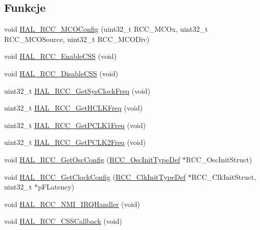 \subsection*{Funkcje}
\begin{DoxyCompactItemize}
\item 
void \hyperlink{group___r_c_c___exported___functions___group2_ga9de46b9c4ecdb1a5e34136b051a6132c}{H\+A\+L\+\_\+\+R\+C\+C\+\_\+\+M\+C\+O\+Config} (uint32\+\_\+t R\+C\+C\+\_\+\+M\+C\+Ox, uint32\+\_\+t R\+C\+C\+\_\+\+M\+C\+O\+Source, uint32\+\_\+t R\+C\+C\+\_\+\+M\+C\+O\+Div)
\item 
void \hyperlink{group___r_c_c___exported___functions___group2_gaa0f440ce71c18e95b12b2044cc044bea}{H\+A\+L\+\_\+\+R\+C\+C\+\_\+\+Enable\+C\+SS} (void)
\item 
void \hyperlink{group___r_c_c___exported___functions___group2_gac2f9cf8f56fd7b22c62ddf32aa5ee3fb}{H\+A\+L\+\_\+\+R\+C\+C\+\_\+\+Disable\+C\+SS} (void)
\item 
uint32\+\_\+t \hyperlink{group___r_c_c___exported___functions___group2_ga887cafe88b21a059061b077a1e3fa7d8}{H\+A\+L\+\_\+\+R\+C\+C\+\_\+\+Get\+Sys\+Clock\+Freq} (void)
\item 
uint32\+\_\+t \hyperlink{group___r_c_c___exported___functions___group2_ga38d6c5c7a5d8758849912c9aa0a2156d}{H\+A\+L\+\_\+\+R\+C\+C\+\_\+\+Get\+H\+C\+L\+K\+Freq} (void)
\item 
uint32\+\_\+t \hyperlink{group___r_c_c___exported___functions___group2_gab3042d8ac5703ac696cabf0ee461c599}{H\+A\+L\+\_\+\+R\+C\+C\+\_\+\+Get\+P\+C\+L\+K1\+Freq} (void)
\item 
uint32\+\_\+t \hyperlink{group___r_c_c___exported___functions___group2_gabbd5f8933a5ee05e4b3384e33026aca1}{H\+A\+L\+\_\+\+R\+C\+C\+\_\+\+Get\+P\+C\+L\+K2\+Freq} (void)
\item 
void \hyperlink{group___r_c_c___exported___functions___group2_gae2f9413fc447c2d7d6af3a8669c77b36}{H\+A\+L\+\_\+\+R\+C\+C\+\_\+\+Get\+Osc\+Config} (\hyperlink{struct_r_c_c___osc_init_type_def}{R\+C\+C\+\_\+\+Osc\+Init\+Type\+Def} $\ast$R\+C\+C\+\_\+\+Osc\+Init\+Struct)
\item 
void \hyperlink{group___r_c_c___exported___functions___group2_gabc95375dfca279d88b9ded9d063d2323}{H\+A\+L\+\_\+\+R\+C\+C\+\_\+\+Get\+Clock\+Config} (\hyperlink{struct_r_c_c___clk_init_type_def}{R\+C\+C\+\_\+\+Clk\+Init\+Type\+Def} $\ast$R\+C\+C\+\_\+\+Clk\+Init\+Struct, uint32\+\_\+t $\ast$p\+F\+Latency)
\item 
void \hyperlink{group___r_c_c___exported___functions___group2_ga0c124cf403362750513cae7fb6e6b195}{H\+A\+L\+\_\+\+R\+C\+C\+\_\+\+N\+M\+I\+\_\+\+I\+R\+Q\+Handler} (void)
\item 
void \hyperlink{group___r_c_c___exported___functions___group2_gaa05b9157de5a48617bd06eb6aafa68aa}{H\+A\+L\+\_\+\+R\+C\+C\+\_\+\+C\+S\+S\+Callback} (void)
\end{DoxyCompactItemize}


